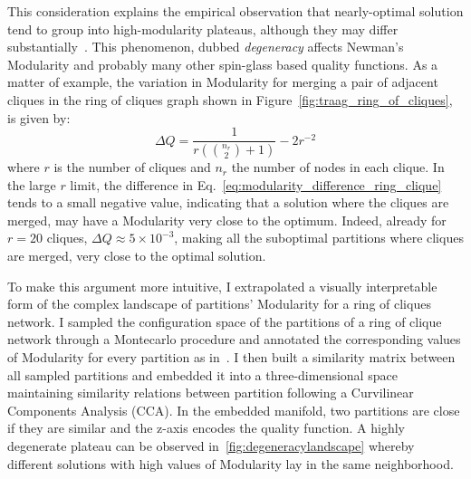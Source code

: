 This consideration explains the empirical observation that nearly-optimal solution tend to group into high-modularity plateaus, although they may differ substantially~\cite{good2009}. This phenomenon, dubbed \emph{degeneracy} affects Newman's Modularity and probably many other spin-glass based quality functions.
As a matter of example, the variation in Modularity for merging a pair of adjacent cliques in the ring of cliques graph shown in Figure~\ref{fig:traag_ring_of_cliques}, is given by:
\begin{equation}\label{eq:modularity_difference_ring_clique}
\Delta Q = \frac{1}{r\left(\binom{n_r}{2}+1\right)}-2r^{-2}
\end{equation}
where $r$ is the number of cliques and $n_r$ the number of nodes in each clique.
In the large $r$ limit, the difference in Eq.~\ref{eq:modularity_difference_ring_clique} tends to a small negative value, indicating that a solution where the cliques are merged, may have a Modularity very close to the optimum.
Indeed, already for $r=20$ cliques, $\Delta Q \approx 5\times 10^{-3}$, making all the suboptimal partitions where cliques are merged, very close to the optimal solution.

To make this argument more intuitive, I extrapolated a visually interpretable form of the complex landscape of partitions' Modularity for a ring of cliques network. I sampled the configuration space of the partitions of a ring of clique network through a Montecarlo procedure and annotated the corresponding values of Modularity for every partition as in~\cite{good2009}.
I then built a similarity matrix between all sampled partitions and embedded it into a three-dimensional space maintaining similarity relations between partition following a Curvilinear Components Analysis (CCA).
In the embedded manifold, two partitions are close if they are similar and the z-axis encodes the quality function.
A highly degenerate plateau can be observed in~\ref{fig:degeneracylandscape} whereby different solutions with high values of Modularity lay in the same neighborhood.


